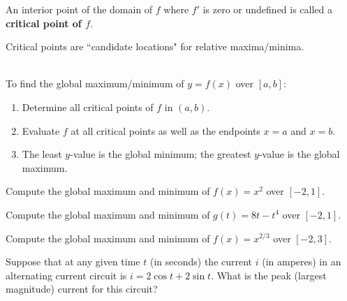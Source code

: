 \vfill
\begin{definition}
An interior point of the domain of $f$ where $f'$ is zero or undefined is called a \textbf{critical point of $f$}.
\end{definition}
\begin{remark}
Critical points are ``candidate locations" for relative maxima/minima.
\end{remark}

\newpage

\begin{remark}\,\\
To find the global maximum/minimum of $y=f(x)$ over $[a,b]$:
\begin{enumerate}
\item Determine all critical points of $f$ in $(a,b)$.
\item Evaluate $f$ at all critical points as well as the endpoints $x=a$ and $x=b$.
\item The least $y$-value is the global minimum; the greatest $y$-value is the global maximum.
\end{enumerate}
\end{remark}
\begin{example}
Compute the global maximum and minimum of $f(x)=x^2$ over $[-2,1]$.
\end{example}
\vfill

\begin{example}
Compute the global maximum and minimum of $g(t)=8t-t^4$ over $[-2,1]$.
\end{example}
\vfill

\newpage

\begin{example}
Compute the global maximum and minimum of $f(x)=x^{2/3}$ over $[-2,3]$.
\end{example}
\vfill

\begin{example}
Suppose that at any given time $t$ (in seconds) the current $i$ (in amperes) in an alternating current circuit is
$i=2\cos t + 2\sin t$.
What is the peak (largest magnitude) current for this circuit?
\end{example}
\vfill


